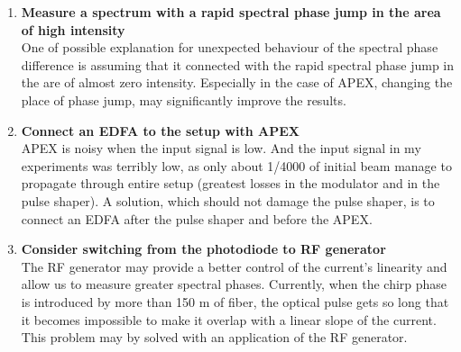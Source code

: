 \documentclass{article}
\begin{document}
\begin{enumerate}
\item \textbf{Measure a spectrum with a rapid spectral phase jump in the area of high intensity}\\
One of possible explanation for unexpected behaviour of the spectral phase difference is assuming that it connected with the rapid spectral phase jump in the are of almost zero intensity. Especially in the case of APEX, changing the place of phase jump, may significantly improve the results.

\item \textbf{Connect an EDFA to the setup with APEX}\\
APEX is noisy when the input signal is low. And the input signal in my experiments was terribly low, as only about 1/4000 of initial beam manage to propagate through entire setup (greatest losses in the modulator and in the pulse shaper). A solution, which should not damage the pulse shaper, is to connect an EDFA after the pulse shaper and before the APEX.

\item \textbf{Consider switching from the photodiode to RF generator}\\
The RF generator may provide a better control of the current's linearity and allow us to measure greater spectral phases. Currently, when the chirp phase is introduced by more than 150 m of fiber, the optical pulse gets so long that it becomes impossible to make it overlap with a linear slope of the current. This problem may by solved with an application of the RF generator.
\end{enumerate}
\end{document}
